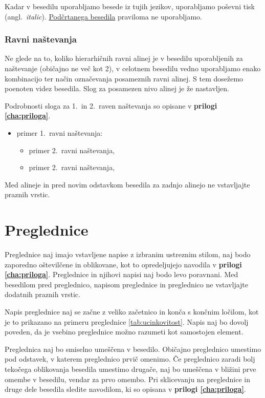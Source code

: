 Kadar v besedilu uporabljamo besede iz tujih jezikov, uporabljamo poševni tisk (angl.~\emph{italic}). \underline{Podčrtanega besedila} praviloma ne uporabljamo.

\subsubsection{Ravni naštevanja}
Ne glede na to, koliko hierarhičnih ravni alinej je v besedilu uporabljenih za naštevanje (običajno ne več kot 2), v celotnem besedilu vedno uporabljamo enako kombinacijo ter način označevanja posameznih ravni alinej. S tem dosežemo poenoten videz besedila. Slog za posamezen nivo alinej je že nastavljen. 

Podrobnosti sloga za 1.~in 2.~raven naštevanja so opisane v \textbf{prilogi \ref{cha:priloga}}.
\begin{itemize}
\item primer 1.~ravni naštevanja:
\begin{itemize}
\item primer 2.~ravni naštevanja,
\item primer 2.~ravni naštevanja,
\end{itemize}
\end{itemize}
Med alineje in pred novim odstavkom besedila za zadnjo alinejo ne vstavljajte praznih vrstic.


\section{Preglednice}\label{sec:preglednice}
Preglednice naj imajo vstavljene napise z izbranim ustreznim stilom, naj bodo zaporedno oštevilčene in oblikovane, kot to opredeljujejo navodila v \textbf{prilogi \ref{cha:priloga}}. Preglednice in njihovi napisi naj bodo levo poravnani. Med besedilom pred preglednico, napisom preglednice in preglednico ne vstavljajte dodatnih praznih vrstic.

Napis preglednice naj se začne z veliko začetnico in konča s končnim ločilom, kot je to prikazano na primeru preglednice \ref{tab:ucinkovitost}. Napis naj bo dovolj poveden, da je vsebino preglednice možno razumeti kot samostojen element.

Preglednica naj bo smiselno umeščena v besedilo. Običajno preglednico umestimo pod odstavek, v katerem preglednico prvič omenimo. Če preglednico zaradi bolj tekočega oblikovanja besedila umestimo drugače, naj bo umeščena v bližini prve omembe v besedilu, vendar za prvo omembo. Pri sklicevanju na preglednice in druge dele besedila sledite navodilom, ki so opisana v \textbf{prilogi \ref{cha:priloga}}.

